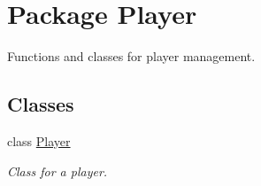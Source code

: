 \hypertarget{namespace_player}{
\section{Package Player}
\label{namespace_player}
}


Functions and classes for player management.  


\subsection*{Classes}
\begin{DoxyCompactItemize}
\item 
class \hyperlink{class_player_1_1_player}{Player}
\begin{DoxyCompactList}\small\item\em Class for a player. \item\end{DoxyCompactList}\end{DoxyCompactItemize}
